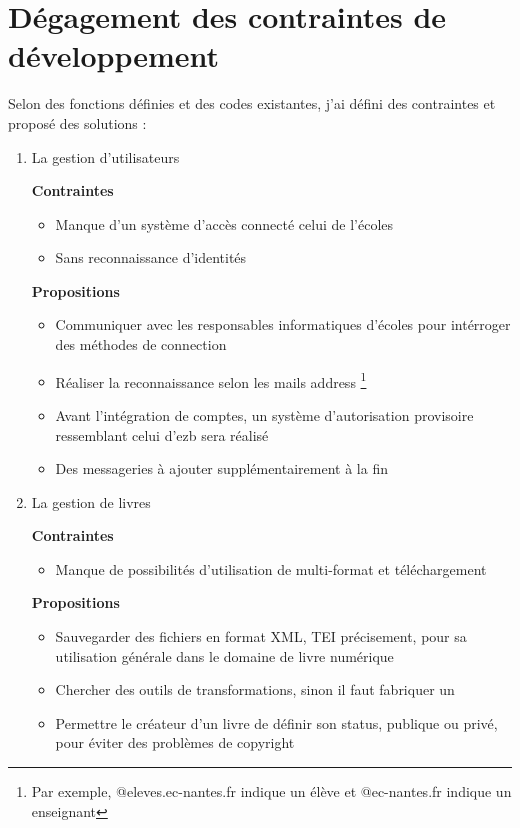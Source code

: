 \section{Dégagement des contraintes de développement}

Selon des fonctions définies et des codes existantes, j'ai défini des contraintes et proposé des solutions :
\begin{enumerate}
    \item La gestion d'utilisateurs
    
    \textbf{Contraintes} 
    \begin{itemize}
        \item Manque d'un système d'accès connecté celui de l’écoles
        \item Sans reconnaissance d’identités
    \end{itemize}
    \textbf{Propositions} 
    \begin{itemize}
        \item Communiquer avec les responsables informatiques d'écoles pour intérroger des méthodes de connection
        \item Réaliser la reconnaissance selon les mails address \footnote{ Par exemple, @eleves.ec-nantes.fr indique un élève et @ec-nantes.fr indique un enseignant } 
        \item Avant l'intégration de comptes, un système d'autorisation provisoire ressemblant celui d'ezb sera réalisé
        \item Des messageries à ajouter supplémentairement à la fin
    \end{itemize}

    \item La gestion de livres

    \textbf{Contraintes} 
    \begin{itemize}
        \item Manque de possibilités d'utilisation de multi-format et téléchargement
    \end{itemize} 
    \textbf{Propositions} 
    \begin{itemize}
        \item Sauvegarder des fichiers en format XML, TEI précisement, pour sa utilisation générale dans le domaine de livre numérique
        \item Chercher des outils de transformations, sinon il faut fabriquer un 
        \item Permettre le créateur d'un livre de définir son status, publique ou privé, pour éviter des problèmes de copyright
    \end{itemize}


\end{enumerate}

